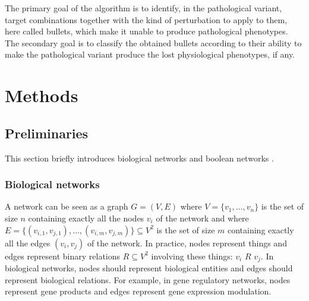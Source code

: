 \documentclass[oneside,a4paper,onecolumn,notitlepage]{article}
\begin{document}
The primary goal of the algorithm is to identify, in the pathological variant, target combinations together with the kind of perturbation to apply to them, here called bullets, which make it unable to produce pathological phenotypes. The secondary goal is to classify the obtained bullets according to their ability to make the pathological variant produce the lost physiological phenotypes, if any.

\section*{Methods}
\subsection*{Preliminaries}
This section briefly introduces biological networks \cite{zhu2007getting} and boolean networks \cite{saadatpour2012boolean}.

\subsubsection*{Biological networks}
A network can be seen as a graph $G=(V,E)$ where $V=\lbrace v_1,\dots,v_n\rbrace$ is the set of size $n$ containing exactly all the nodes $v_i$ of the network and where $E=\lbrace (v_{i,1},v_{j,1}),\dots,(v_{i,m},v_{j,m})\rbrace \subseteq V^2$ is the set of size $m$ containing exactly all the edges $(v_{i},v_{j})$ of the network. In practice, nodes represent things and edges represent binary relations $R\subseteq V^2$ involving these things: $v_{i}$ $R$ $v_{j}$. In biological networks, nodes should represent biological entities and edges should represent biological relations. For example, in gene regulatory networks, nodes represent gene products and edges represent gene expression modulation.
\end{document}
